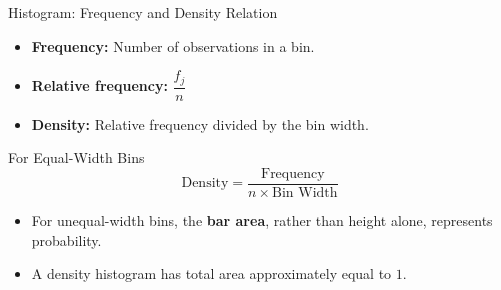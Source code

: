 \documentclass{beamer}
\begin{document}
\begin{frame}{Histogram: Frequency and Density Relation}

\begin{itemize}
    \item \textbf{Frequency:} Number of observations in a bin.
    
    \item \textbf{Relative frequency:} $\dfrac{f_j}{n}$
    
    \item \textbf{Density:} Relative frequency divided by the bin width.
\end{itemize}

\vspace{0.2cm}

\begin{block}{For Equal-Width Bins}
\[
\boxed{
\text{Density}
=
\frac{\text{Frequency}}
{n \times \text{Bin Width}}
}
\]
\end{block}

\vspace{0.15cm}

\begin{itemize}
    \item For unequal-width bins, the \textbf{bar area}, rather than
          height alone, represents probability.
    \item A density histogram has total area approximately equal to $1$.
\end{itemize}

\end{frame}


\end{document}
